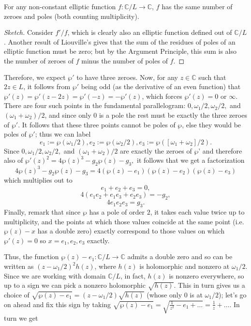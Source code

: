 \begin{lemma}
    For any non-constant elliptic function $f: \mathbb{C} / L \to \mathbb{C}$, $f$ has the same number of zeroes and poles (both counting multiplicity).
\end{lemma}

\begin{proof}[Sketch]
    Consider $f' / f$, which is clearly also an elliptic function defined out of $\mathbb{C}/L$. Another result of Liouville's gives that the sum of the residues of poles of an elliptic function must be zero; but by the Argument Principle, this sum is also the number of zeroes of $f$ minus the number of poles of $f$.
\end{proof}

Therefore, we expect $\wp'$ to have three zeroes. Now, for any $z \in \mathbb{C}$ such that $2z \in L$, it follows from $\wp'$ being odd (as the derivative of an even function) that $\wp'(z) = \wp'(z - 2z) =\wp'(-z) = - \wp'(z) $, which forces $\wp'(z) = 0$ or $\infty$. There are four such points in the fundamental parallelogram: $0, \omega_1/2, \omega_2/2, $ and $(\omega_1 + \omega_2)/2$, and since only $0$ is a pole the rest must be exactly the three zeroes of $\wp'$.  It follows that these three points cannot be poles of $\wp$, else they would be poles of $\wp'$; thus we can label
\[e_1 := \wp(\omega_1/2), e_2:=\wp(\omega_2/2), e_3 := \wp([\omega_1 + \omega_2]/2).\]
Since $0, \omega_1/2, \omega_2/2, $ and $(\omega_1 + \omega_2)/2$ are exactly the zeroes of $\wp$' and therefore also of $\wp' (z)^2 = 4 \wp(z)^3 - g_2 \wp(z)- g_3,$ it follows that we get a factorization
\[4 \wp(z)^3 - g_2 \wp(z)- g_3 = 4(\wp(z) - e_1) (\wp(z)  - e_2) (\wp(z) - e_3)\]
which multiplies out to
\[e_1 + e_2 + e_3 = 0,\]
\[4(e_1 e_2 + e_1 e_3 + e_2 e_3) = - g_2,\]
\[ 4 e_1 e_2 e_3 = g_3 .\]
Finally, remark that since $\wp$ has a pole of order $2$, it takes each value twice up to multiplicity, and the points at which those values coincide at the same point (i.e. $\wp(z) - x$ has a double zero) exactly correspond to those values on which $\wp'(z) = 0$ so $x = e_1, e_2, e_3$ exactly. 

Thus, the function $\wp(z) - e_1: \mathbb{C}/L \to \mathbb{C}$ admits a double zero and so can be written as $(z - \omega_1/2)^2 h(z)$, where $h(z)$ is holomorphic and nonzero at $\omega_1/2$. Since we are working with domain $\mathbb{C}/L$, in fact, $h(z)$ is nonzero everywhere, so up to a sign we can pick a nonzero holomorphic $\sqrt{h(z)}$. This in turn gives us a choice of $\sqrt{\wp(z) - e_1} = (z - \omega_1/2)  \sqrt{h(z)}$ (whose only $0$ is at $\omega_1/2$); let's go on ahead and fix this sign by taking $\sqrt{\wp(z) - e_1} = \sqrt{\frac{1}{z^2} - e_1 + \dots} = \frac{1}{z} + \dots$. In turn we get

